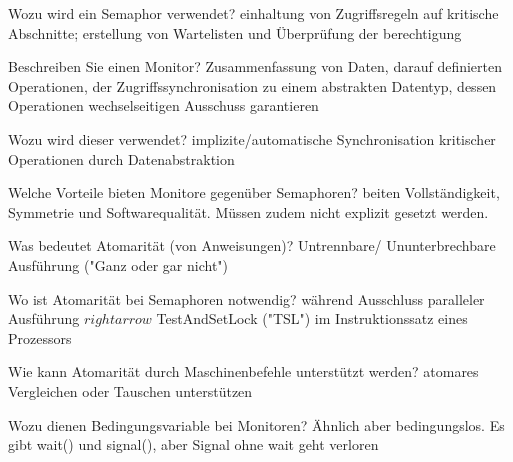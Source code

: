 \documentclass[avery5371]{flashcards}
\begin{document}
\begin{flashcard}[Semaphor]{Wozu wird ein Semaphor verwendet?}
    einhaltung von Zugriffsregeln auf kritische Abschnitte; erstellung von Wartelisten und Überprüfung der berechtigung
\end{flashcard}

\begin{flashcard}{Beschreiben Sie einen Monitor?}
    Zusammenfassung von Daten, darauf definierten Operationen, der Zugriffssynchronisation zu einem abstrakten Datentyp, dessen Operationen wechselseitigen Ausschuss garantieren
\end{flashcard}

\begin{flashcard}{Wozu wird dieser verwendet?}
    implizite/automatische Synchronisation kritischer Operationen durch Datenabstraktion
\end{flashcard}

\begin{flashcard}{Welche Vorteile bieten Monitore gegenüber Semaphoren? }
    beiten Vollständigkeit, Symmetrie und Softwarequalität. Müssen zudem nicht explizit gesetzt werden.
\end{flashcard}

\begin{flashcard}{Was bedeutet Atomarität (von Anweisungen)?}
    Untrennbare/ Ununterbrechbare Ausführung ("Ganz oder gar nicht")
\end{flashcard}

\begin{flashcard}{Wo ist Atomarität bei Semaphoren notwendig?}
    während Ausschluss paralleler Ausführung $rightarrow$ TestAndSetLock ("TSL") im Instruktionssatz eines Prozessors
\end{flashcard}

\begin{flashcard}{Wie kann Atomarität durch Maschinenbefehle unterstützt werden?}
    atomares Vergleichen oder Tauschen unterstützen
\end{flashcard}

\begin{flashcard}{Wozu dienen Bedingungsvariable bei Monitoren? }
    Ähnlich aber bedingungslos. Es gibt wait() und signal(), aber Signal ohne wait geht verloren
\end{flashcard}
\end{document}
